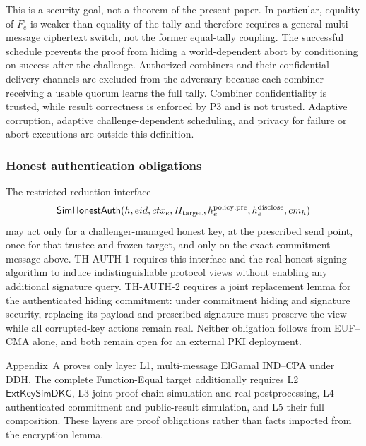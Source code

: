 \documentclass[pdflatex,sn-mathphys-num]{sn-jnl}%
\theoremstyle{thmstyleone}%
\theoremstyle{thmstyletwo}%
\theoremstyle{thmstylethree}%
\begin{document}
This is a security goal, not a theorem of the present paper.  In particular,
equality of $F_e$ is weaker than equality of the tally and therefore requires a
general multi-message ciphertext switch, not the former equal-tally coupling.
The successful schedule prevents the proof from hiding a world-dependent
abort by conditioning on success after the challenge.
Authorized combiners and their confidential delivery channels are excluded
from the adversary because each combiner receiving a usable quorum learns the
full tally.  Combiner confidentiality is trusted, while result correctness is
enforced by P3 and is not trusted.  Adaptive corruption, adaptive
challenge-dependent scheduling, and privacy for failure or abort executions
are outside this definition.

\subsubsection{Honest authentication obligations}
The restricted reduction interface
\[
\mathsf{SimHonestAuth}(h,eid,ctx_e,H_{\rm target},
h_e^{\rm policy,pre},h_e^{\rm disclose},cm_h)
\]
may
act only for a challenger-managed honest key, at the prescribed send point,
once for that trustee and frozen target, and only on the exact commitment
message above.  TH-AUTH-1 requires this interface and the real honest signing
algorithm to induce indistinguishable protocol views without enabling any
additional signature query.  TH-AUTH-2 requires a joint replacement lemma for
the authenticated hiding commitment: under commitment hiding and signature
security, replacing its payload and prescribed signature must preserve the
view while all corrupted-key actions remain real.  Neither obligation follows
from EUF--CMA alone, and both remain open for an external PKI deployment.

Appendix~A proves only layer L1, multi-message ElGamal IND--CPA under DDH.
The complete Function-Equal target additionally requires L2
$\mathsf{ExtKeySimDKG}$, L3 joint proof-chain simulation and real
postprocessing, L4 authenticated commitment and public-result simulation, and
L5 their full composition.  These layers are proof obligations rather than
facts imported from the encryption lemma.
\end{document}
